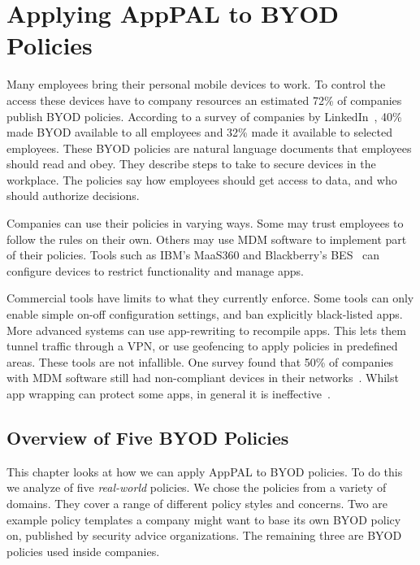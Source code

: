 \documentclass[thesis.tex]{subfiles}
\begin{document}
\chapter{Applying AppPAL to BYOD Policies}
\label{chap:byod}

Many employees bring their personal mobile devices to work. To control
the access these devices have to company resources an estimated 72\%
of companies publish \ac{BYOD} policies. According to a survey of
companies by LinkedIn~\cite{schulze_byod_2016}, 40\% made \ac{BYOD}
available to all employees and 32\% made it available to selected
employees. These \ac{BYOD} policies are natural language documents
that employees should read and obey. They describe steps to take to
secure devices in the workplace. The policies say how employees should
get access to data, and who should authorize decisions.

Companies can use their policies in varying ways. Some may
trust employees to follow the rules on their own. Others may use
\ac{MDM} software to implement part of their policies. Tools such as
IBM's MaaS360 and Blackberry's BES~\cite{ibm_ibm_nodate,blackberry_secure_nodate} can
configure devices to restrict functionality and manage apps.

Commercial tools have limits to what they currently enforce. Some
tools can only enable simple on-off configuration settings, and ban
explicitly black-listed apps. More advanced systems can use
app-rewriting to recompile apps. This lets them tunnel traffic through a VPN, or use
geofencing to apply policies in predefined areas. These tools are not
infallible. One survey found that 50\% of companies with \ac{MDM}
software still had non-compliant devices in their
networks~\cite{mobileiron_security_labs_q4_2015}. Whilst app wrapping
can protect some apps, in general it is
ineffective~\cite{hao_effectiveness_2013}.

\section{Overview of Five BYOD Policies}
\label{sec:overview-of-five-byod-policies}

This chapter looks at how we can apply AppPAL to
BYOD policies.  To do this we analyze of five \emph{real-world} policies.
We chose the policies from a variety of domains.  They cover a range
of different policy styles and concerns.  Two are example policy
templates a company might want to base its own BYOD policy on,
published by security advice organizations.  The remaining three are
BYOD policies used inside companies.
\end{document}
